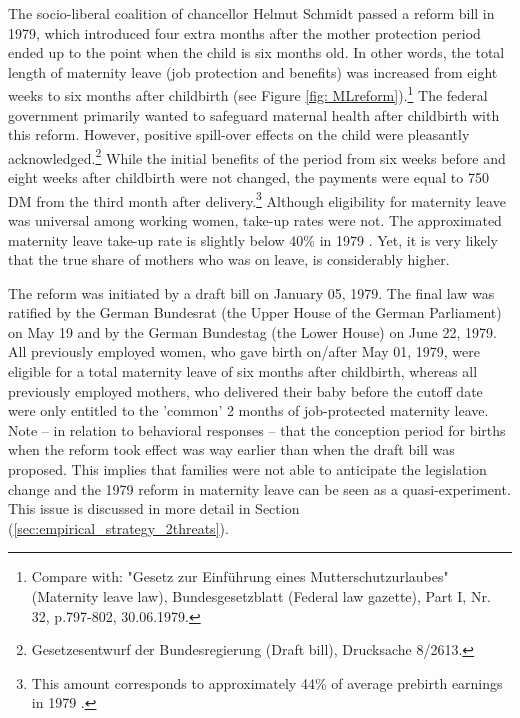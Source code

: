 \documentclass[11pt, a4paper,draft]{article} %
\begin{document}
The socio-liberal coalition of chancellor Helmut Schmidt passed a reform bill in 1979, which introduced four extra months after the mother protection period ended up to the point when the child is six months old. In other words, the total length of maternity leave (job protection and benefits) was increased from eight weeks to six months after childbirth (see Figure \ref{fig: MLreform}).\footnote{Compare with: "Gesetz zur Einführung eines Mutterschutzurlaubes" (Maternity leave law), Bundesgesetzblatt (Federal law gazette), Part I, Nr. 32, p.797-802, 30.06.1979.} The federal government primarily wanted to safeguard maternal health after childbirth with this reform. However, positive spill-over effects on the child were pleasantly acknowledged.\footnote{Gesetzesentwurf der Bundesregierung (Draft bill), Drucksache 8/2613.} While the initial benefits of the period from six weeks before and eight weeks after childbirth were not changed, the payments were equal to 750 DM from the third month after delivery.\footnote{This amount corresponds to approximately 44\% of average prebirth earnings in 1979 \citep{schonberg2014expansions}.} Although eligibility for maternity leave was universal among working women, take-up rates were not. The approximated maternity leave take-up rate is slightly below 40\% in 1979 \citep{Dustmann2012}. Yet, it is very likely that the true share of mothers who was on leave, is considerably higher. 
\newline

The reform was initiated by a draft bill on January 05, 1979. The final law was ratified by the German Bundesrat (the Upper House of the German Parliament) on May 19 and by the German Bundestag (the Lower House) on June 22, 1979.  All previously employed women, who gave birth on/after May 01, 1979, were eligible for a total maternity leave of six months after childbirth, whereas all previously employed mothers, who delivered their baby before the cutoff date were only entitled to the 'common' 2 months of job-protected maternity leave. Note -- in relation to behavioral responses -- that the conception period for births when the reform took effect was way earlier than when the draft bill was proposed. This implies that families were not able to anticipate the legislation change and the 1979 reform in maternity leave can be seen as a quasi-experiment. This issue is discussed in more detail in Section (\ref{sec:empirical_strategy_2threats}).
\end{document}
